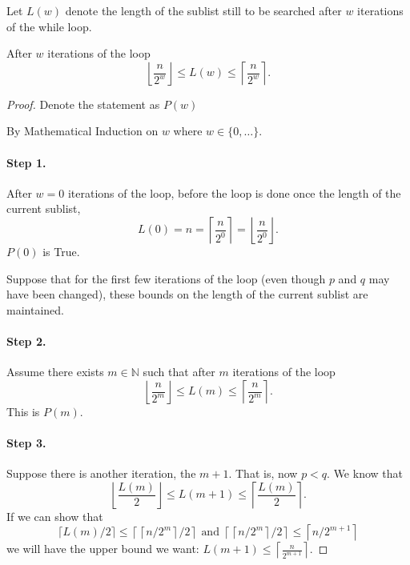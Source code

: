     Let $L(w)$ denote the length of the sublist still to be searched after $w$ iterations of the while loop.
    \begin{theorem}\label{4.2.1}
        After $w$ iterations of the loop
        \[
        \left\lfloor \frac{n}{2^w} \right\rfloor \leq L(w) \leq \left\lceil \frac{n}{2^w} \right\rceil.
        \]
    \end{theorem}
    \begin{proof}
        Denote the statement as $P(w)$

        By Mathematical Induction on $w$ where $w \in \{0, \ldots\}$.

    \paragraph{Step 1.}
        After $w = 0$ iterations of the loop, before the loop is done once the length of the current sublist,
        \[
        L(0) = n = \left\lceil \frac{n}{2^0} \right\rceil = \left\lfloor \frac{n}{2^0} \right\rfloor.
        \]
        $P(0)$ is True.

        Suppose that for the first few iterations of the loop (even though $p$ and $q$ may have been changed), these bounds on the length of the current sublist are maintained.

        \paragraph{Step 2.}
        Assume there exists $m \in \mathbb{N}$ such that after $m$ iterations of the loop
        \[
        \left\lfloor \frac{n}{2^m} \right\rfloor \leq L(m) \leq \left\lceil \frac{n}{2^m} \right\rceil.
        \]
        This is $P(m)$.

        \paragraph{Step 3.}
        Suppose there is another iteration, the $m + 1$. That is, now $p < q$. We know that
        \[
        \left\lfloor \frac{L(m)}{2} \right\rfloor \leq L(m + 1) \leq \left\lceil \frac{L(m)}{2} \right\rceil.
        \]
        If we can show that
        \[
        \lceil L(m) / 2\rceil\leq\left\lceil\left\lceil n / 2^{m}\right\rceil / 2\right\rceil \text { and }\left\lceil\left\lceil n / 2^{m}\right\rceil / 2\right\rceil \leq \left\lceil n / 2^{m+1}\right\rceil
        \]
        we will have the upper bound we want: $L(m + 1) \leq \left\lceil \frac{n}{2^{m+1}} \right\rceil$.


\end{proof}

